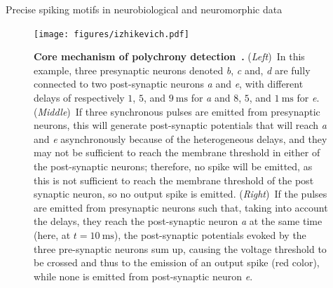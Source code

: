 \documentclass[final]{beamer}
\newcommand{\ms}{\si{\milli\second}}%
\newlength{\colwidth}
\begin{document}
\begin{frame}[t]
\begin{columns}[t]
\begin{column}{\colwidth}
\begin{block}{Precise spiking motifs in neurobiological and neuromorphic data~\parencite{Grimaldi22polychronies}}
    \begin{figure}[H]%
        \texttt{[image: figures/izhikevich.pdf]}%
          \caption{\textbf{Core mechanism of polychrony detection~\textcite{izhikevich_polychronization_2006}.} {(\textit{Left})}~In this example, three presynaptic neurons denoted \textit{b}, \textit{c} and, \textit{d} are fully connected to two post-synaptic neurons \textit{a} and \textit{e}, with different delays of respectively $1$, $5$, and $9~\ms$ for \textit{a} and  $8$, $5$, and $1~\ms$ for \textit{e}. {(\textit{Middle})}~If three synchronous pulses are emitted from presynaptic neurons, this will generate post-synaptic potentials that will reach \textit{a} and \textit{e} asynchronously because of the heterogeneous delays, and they may not be sufficient to reach the membrane threshold in either of the post-synaptic neurons; therefore, no spike will be emitted, as this is not sufficient to reach the membrane threshold of the post synaptic neuron, so no output spike is emitted.
          {(\textit{Right})}~If the pulses are emitted from presynaptic neurons such that, taking into account the delays, they reach the post-synaptic neuron \textit{a} at the same time (here, at $t=10~\ms$),  the post-synaptic potentials evoked by the three pre-synaptic neurons sum up, causing the voltage threshold to be crossed and thus to the emission of an output spike (red color), while none is emitted from post-synaptic neuron \textit{e}.
           }
        \label{fig:izhikevich}
      \end{figure}
%

  \end{block}


\end{column}
\end{columns}
\end{frame}
\end{document}
